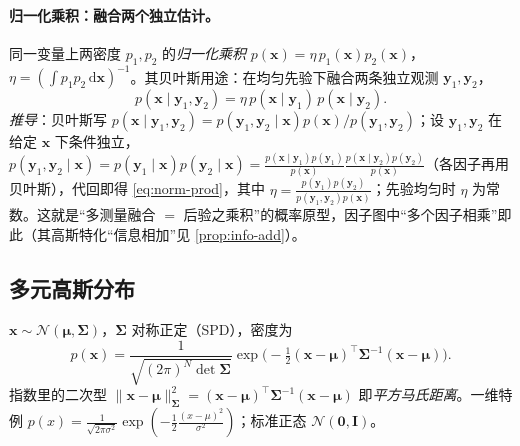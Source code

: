 \paragraph{归一化乘积：融合两个独立估计。}
同一变量上两密度 $p_1,p_2$ 的\emph{归一化乘积} $p(\mathbf{x})=\eta\,p_1(\mathbf{x})p_2(\mathbf{x})$，$\eta=(\int p_1 p_2\,\mathrm{d}\mathbf{x})^{-1}$。其贝叶斯用途：在均匀先验下融合两条独立观测 $\mathbf{y}_1,\mathbf{y}_2$，
\begin{equation}
  p(\mathbf{x}\mid\mathbf{y}_1,\mathbf{y}_2)=\eta\,p(\mathbf{x}\mid\mathbf{y}_1)\,p(\mathbf{x}\mid\mathbf{y}_2).
  \label{eq:norm-prod}
\end{equation}
\emph{推导}：贝叶斯写 $p(\mathbf{x}\mid\mathbf{y}_1,\mathbf{y}_2)=p(\mathbf{y}_1,\mathbf{y}_2\mid\mathbf{x})p(\mathbf{x})/p(\mathbf{y}_1,\mathbf{y}_2)$；设 $\mathbf{y}_1,\mathbf{y}_2$ 在给定 $\mathbf{x}$ 下条件独立，$p(\mathbf{y}_1,\mathbf{y}_2\mid\mathbf{x})=p(\mathbf{y}_1\mid\mathbf{x})p(\mathbf{y}_2\mid\mathbf{x})=\tfrac{p(\mathbf{x}\mid\mathbf{y}_1)p(\mathbf{y}_1)}{p(\mathbf{x})}\tfrac{p(\mathbf{x}\mid\mathbf{y}_2)p(\mathbf{y}_2)}{p(\mathbf{x})}$（各因子再用贝叶斯），代回即得 \cref{eq:norm-prod}，其中 $\eta=\tfrac{p(\mathbf{y}_1)p(\mathbf{y}_2)}{p(\mathbf{y}_1,\mathbf{y}_2)p(\mathbf{x})}$；先验均匀时 $\eta$ 为常数。这就是“多测量融合 $=$ 后验之乘积”的概率原型，因子图中“多个因子相乘”即此（其高斯特化“信息相加”见 \cref{prop:info-add}）。

\subsection{多元高斯分布}
\label{sec:est-gauss-def}

\begin{definition}[多元高斯分布]\label{def:gaussian}
$\mathbf{x}\sim\mathcal{N}(\boldsymbol{\mu},\boldsymbol{\Sigma})$，$\boldsymbol{\Sigma}$ 对称正定（SPD），密度为
\begin{equation}
  p(\mathbf{x})=\frac{1}{\sqrt{(2\pi)^{N}\det\boldsymbol{\Sigma}}}
  \exp\!\Big(-\tfrac12(\mathbf{x}-\boldsymbol{\mu})^\top\boldsymbol{\Sigma}^{-1}(\mathbf{x}-\boldsymbol{\mu})\Big).
  \label{eq:gaussian}
\end{equation}
指数里的二次型 $\|\mathbf{x}-\boldsymbol{\mu}\|_{\boldsymbol{\Sigma}}^2=(\mathbf{x}-\boldsymbol{\mu})^\top\boldsymbol{\Sigma}^{-1}(\mathbf{x}-\boldsymbol{\mu})$ 即\emph{平方马氏距离}。一维特例 $p(x)=\tfrac{1}{\sqrt{2\pi\sigma^2}}\exp(-\tfrac12\tfrac{(x-\mu)^2}{\sigma^2})$；标准正态 $\mathcal{N}(\mathbf{0},\mathbf{I})$。
\end{definition}

